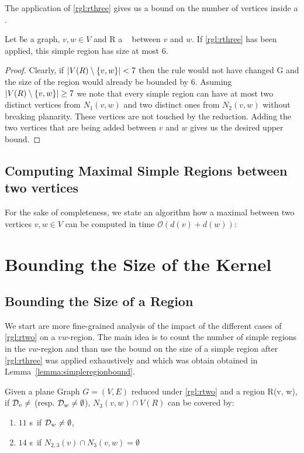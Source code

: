 The application of \cref{rgl:rthree} gives us a bound on the number of vertices inside a \sr. 
\begin{corollary}\label{lemma:simpleregionbound}
    Let \G be a graph, $v, w\in V$ and R a \sr~ between $v$ and $w$. If \cref{rgl:rthree} has been applied, this simple region has size at most 6.
\end{corollary}
\begin{proof}
    Clearly, if $\abs{V(R) \setminus \{v, w\}} < 7$ then the rule would not have changed G and the size of the region would already be bounded by 6.
    Asuming $\abs{V(R) \setminus \{v, w\}} \geq 7$ we note that every simple region can have at most two distinct vertices from $N_1(v,w)$ and two distinct ones from $N_2(v,w)$ without breaking planarity. These vertices are not touched by the reduction. Adding the two vertices that are being added between $v$ and $w$ gives us the desired upper bound.
\end{proof}

\subsection{Computing Maximal Simple Regions between two vertices}

For the sake of completeness, we state an algorithm how a maximal \sr between two vertices $v,w \in V$ can be computed in time $\mathcal{O}(d(v) + d(w))$:

\section{Bounding the Size of the Kernel}

\subsection{Bounding the Size of a Region}

We start are more fine-grained analysis of the impact of the different cases of \cref*{rgl:rtwo} on a $vw$-region. The main idea is to count the number of simple regions in the $vw$-region and than use the bound on the size of a simple region after \cref*{rgl:rthree} was applied exhaustively and which was obtain obtained in Lemma~\ref{lemma:simpleregionbound}.   

\begin{lemma}
   Given a plane Graph $G = (V,E)$ reduced under \cref{rgl:rtwo} and a region R(v, w), if $\mathcal{D}_{v} \neq $ (resp. $\mathcal{D}_{w} \neq \emptyset$), $N_3(v,w) \cap V(R)$ can be covered by: 
   \begin{enumerate}
    \item $11$ \sr s~if $\mathcal{D}_{w} \neq \emptyset$, 
    \item $14$ \sr s~if $N_{2,3}(v) \cap N_3(v,w) = \emptyset$
   \end{enumerate}
\end{lemma}

